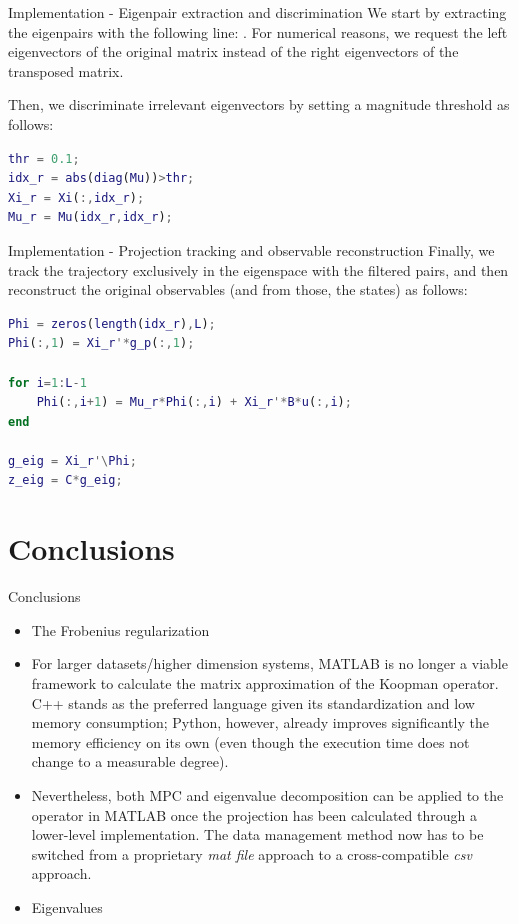 \documentclass{beamer}
\begin{document}
\begin{frame}[fragile]{Implementation - Eigenpair extraction and discrimination}
    We start by extracting the eigenpairs with the following line: . For numerical reasons, we request the left eigenvectors of the original matrix instead of the right eigenvectors of the transposed matrix.

    Then, we discriminate irrelevant eigenvectors by setting a magnitude threshold as follows:

    \begin{lstlisting}[language=Matlab]
thr = 0.1;
idx_r = abs(diag(Mu))>thr;
Xi_r = Xi(:,idx_r);
Mu_r = Mu(idx_r,idx_r);
    \end{lstlisting}    
\end{frame}

\begin{frame}[fragile]{Implementation - Projection tracking and observable reconstruction}
    Finally, we track the trajectory exclusively in the eigenspace with the filtered pairs, and then reconstruct the original observables (and from those, the states) as follows:

    \begin{lstlisting}[language=Matlab]
Phi = zeros(length(idx_r),L);
Phi(:,1) = Xi_r'*g_p(:,1);

for i=1:L-1
    Phi(:,i+1) = Mu_r*Phi(:,i) + Xi_r'*B*u(:,i);
end

g_eig = Xi_r'\Phi;
z_eig = C*g_eig;
    \end{lstlisting}
\end{frame}


\section{Conclusions}

\begin{frame}[allowframebreaks]{Conclusions}
    \begin{itemize}
        \item The Frobenius regularization 
        \item For larger datasets/higher dimension systems, MATLAB is no longer a viable framework to calculate the matrix approximation of the Koopman operator. C++ stands as the preferred language given its standardization and low memory consumption; Python, however, already improves significantly the memory efficiency on its own (even though the execution time does not change to a measurable degree).
        \item Nevertheless, both MPC and eigenvalue decomposition can be applied to the operator in MATLAB once the projection has been calculated through a lower-level implementation. The data management method now has to be switched from a proprietary \textit{mat file} approach to a cross-compatible \textit{csv} approach.
        \item Eigenvalues 
    \end{itemize}
\end{frame}
\end{document}
